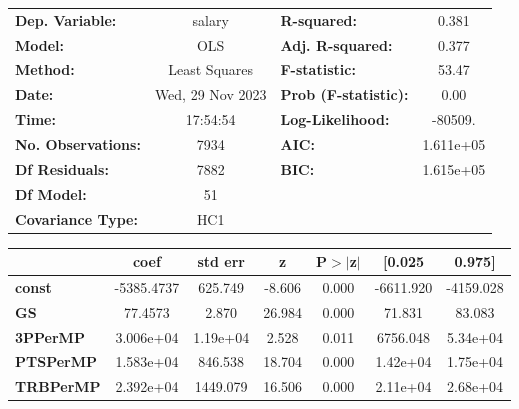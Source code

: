 \begin{center}
\begin{tabular}{lclc}
\toprule
\textbf{Dep. Variable:}       &      salary      & \textbf{  R-squared:         } &     0.381   \\
\textbf{Model:}               &       OLS        & \textbf{  Adj. R-squared:    } &     0.377   \\
\textbf{Method:}              &  Least Squares   & \textbf{  F-statistic:       } &     53.47   \\
\textbf{Date:}                & Wed, 29 Nov 2023 & \textbf{  Prob (F-statistic):} &     0.00    \\
\textbf{Time:}                &     17:54:54     & \textbf{  Log-Likelihood:    } &   -80509.   \\
\textbf{No. Observations:}    &        7934      & \textbf{  AIC:               } & 1.611e+05   \\
\textbf{Df Residuals:}        &        7882      & \textbf{  BIC:               } & 1.615e+05   \\
\textbf{Df Model:}            &          51      & \textbf{                     } &             \\
\textbf{Covariance Type:}     &       HC1        & \textbf{                     } &             \\
\bottomrule
\end{tabular}
\begin{tabular}{lcccccc}
                              & \textbf{coef} & \textbf{std err} & \textbf{z} & \textbf{P$> |$z$|$} & \textbf{[0.025} & \textbf{0.975]}  \\
\midrule
\textbf{const}                &   -5385.4737  &      625.749     &    -8.606  &         0.000        &    -6611.920    &    -4159.028     \\
\textbf{GS}                   &      77.4573  &        2.870     &    26.984  &         0.000        &       71.831    &       83.083     \\
\textbf{3PPerMP}              &    3.006e+04  &     1.19e+04     &     2.528  &         0.011        &     6756.048    &     5.34e+04     \\
\textbf{PTSPerMP}             &    1.583e+04  &      846.538     &    18.704  &         0.000        &     1.42e+04    &     1.75e+04     \\
\textbf{TRBPerMP}             &    2.392e+04  &     1449.079     &    16.506  &         0.000        &     2.11e+04    &     2.68e+04     \\

\end{tabular}
\end{center}
